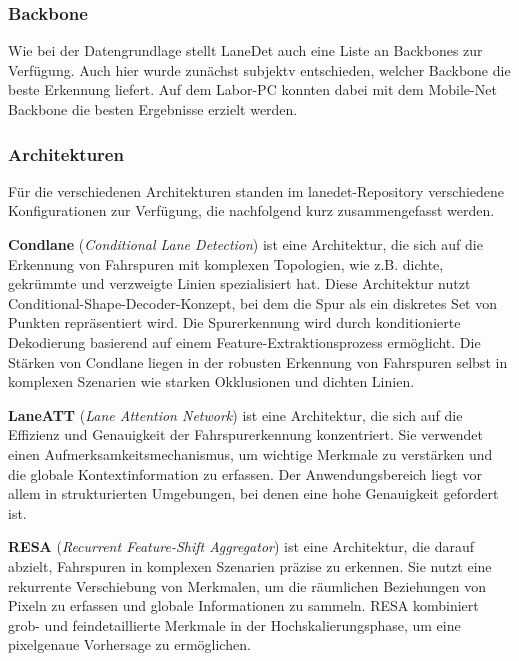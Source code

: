 \documentclass{article}
\begin{document}

            \subsubsection{Backbone}
            Wie bei der Datengrundlage stellt LaneDet auch eine Liste an Backbones zur Verfügung. Auch hier wurde zunächst subjektv entschieden, welcher Backbone die beste Erkennung liefert.
            Auf dem Labor-PC konnten dabei mit dem Mobile-Net Backbone die besten Ergebnisse erzielt werden.
            \subsubsection{Architekturen}
                Für die verschiedenen Architekturen standen im lanedet-Repository verschiedene Konfigurationen zur Verfügung, die nachfolgend kurz zusammengefasst werden.

                \textbf{Condlane} (\textit{Conditional Lane Detection}) ist eine Architektur, die sich auf die Erkennung von Fahrspuren mit komplexen Topologien, wie z.B. dichte, gekrümmte und verzweigte Linien spezialisiert hat. Diese Architektur nutzt Conditional-Shape-Decoder-Konzept, bei dem die Spur als ein diskretes Set von Punkten repräsentiert wird. Die Spurerkennung wird durch konditionierte Dekodierung basierend auf einem Feature-Extraktionsprozess ermöglicht. Die Stärken von Condlane liegen in der robusten Erkennung von Fahrspuren selbst in komplexen Szenarien wie starken Okklusionen und dichten Linien.
                \cite{Ganeriwala2023Cross}

                \textbf{LaneATT} (\textit{Lane Attention Network}) ist eine Architektur, die sich auf die Effizienz und Genauigkeit der Fahrspurerkennung konzentriert. Sie verwendet einen Aufmerksamkeitsmechanismus, um wichtige Merkmale zu verstärken und die globale Kontextinformation zu erfassen. Der Anwendungsbereich liegt vor allem in strukturierten Umgebungen, bei denen eine hohe Genauigkeit gefordert ist. 
                \cite{He2021Fast}

                \textbf{RESA} (\textit{Recurrent Feature-Shift Aggregator}) ist eine Architektur, die darauf abzielt, Fahrspuren in komplexen Szenarien präzise zu erkennen. Sie nutzt eine rekurrente Verschiebung von Merkmalen, um die räumlichen Beziehungen von Pixeln zu erfassen und globale Informationen zu sammeln. RESA kombiniert grob- und feindetaillierte Merkmale in der Hochskalierungsphase, um eine pixelgenaue Vorhersage zu ermöglichen.
                \cite{Zheng2020RESA}
\end{document}
